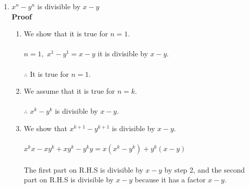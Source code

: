 \documentclass[11pt,a4paper]{article}
\begin{document}
\begin{enumerate}
\item[(d).] $x^n-y^n$ is divisible by $x-y$\\

\textbf{Proof}
\begin{enumerate}
\item[\textbf{Step 1:}] We show that it is true for $n=1$.\\\\
$n=1,$\hspace{1cm} $x^1-y^1=x-y$\hspace{0.3cm} it is divisible by $x-y$.\\\\
$\therefore$\hspace{1cm} It is true for $n=1$.\\

\item[\textbf{Step 2:}] We assume that it is true for $n=k$.\\\\
$\therefore$\hspace{1cm} $x^k-y^k$ is divisible by $x-y$.\\

\item[\textbf{Step 3:}] We show that $x^{k+1}-y^{k+1}$ is divisible by $x-y$.\\\\
$x^kx-xy^k+xy^k-y^ky=x(x^k-y^k)+y^k(x-y)$\\\\
The first part on R.H.S is divisible by $x-y$ by step 2, and the second part on R.H.S is divisible by $x-y$ because it has a factor $x-y$.\\\\
\end{enumerate}
\end{enumerate}
\end{document}
